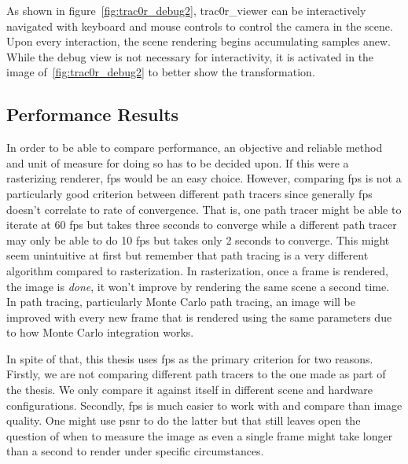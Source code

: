 \documentclass[
  twoside,
  11pt, a4paper,
  footinclude=true,
  headinclude=true,
  cleardoublepage=empty
]{scrreprt}
\begin{document}
As shown in figure~\ref{fig:trac0r_debug2}, trac0r\_viewer can be interactively navigated with
keyboard and mouse controls to control the camera in the scene. Upon every interaction, the scene
rendering begins accumulating samples anew. While the debug view is not necessary for
interactivity, it is activated in the image of~\ref{fig:trac0r_debug2} to better show the
transformation.

\subsection{Performance Results}
In order to be able to compare performance, an objective and reliable method and unit of
measure for doing so has to be decided upon. If this were a rasterizing renderer, \ac{fps} would be
an easy choice.
However, comparing \ac{fps} is not a particularly good criterion between different path tracers since
generally \ac{fps} doesn't correlate to rate of convergence. That is, one path tracer might be able
to iterate at 60 \ac{fps} but takes three seconds to converge while a different path tracer may
only be able to do 10 \ac{fps} but takes only 2 seconds to converge. This might seem unintuitive at
first but remember that path tracing is a very different algorithm compared to rasterization. In
rasterization, once a frame is rendered, the image is \emph{done}, it won't improve by rendering the
same scene a second time. In path tracing, particularly Monte Carlo path tracing, an image will be
improved with every new frame that is rendered using the same parameters due to how Monte Carlo
integration works.

In spite of that, this thesis uses \ac{fps} as the primary criterion for two reasons. Firstly, we are not
comparing different path tracers to the one made as part of the thesis. We only compare it
against itself in different scene and hardware configurations. Secondly, \ac{fps} is much easier
to work with and compare than image quality. One might use \ac{psnr} to do the latter but that
still leaves open the question of when to measure the image as even a single frame might take
longer than a second to render under specific circumstances.
\end{document}
